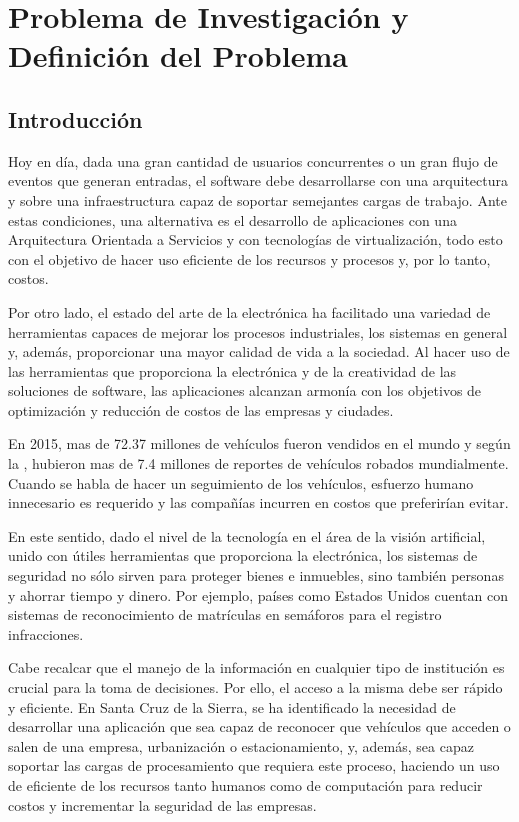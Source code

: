 \chapter{Problema de Investigación y Definición del Problema}
\section{Introducción}

    Hoy en día, dada una gran cantidad de usuarios concurrentes o un gran flujo de eventos que generan entradas, el software debe desarrollarse con una arquitectura y sobre una infraestructura capaz de soportar semejantes cargas de trabajo. Ante estas condiciones, una alternativa es el desarrollo de aplicaciones con una Arquitectura Orientada a Servicios y con tecnologías de virtualización, todo esto con el objetivo de hacer uso eficiente de los recursos y procesos y, por lo tanto, costos.
    
    Por otro lado, el estado del arte de la electrónica ha facilitado una variedad de herramientas capaces de mejorar los procesos industriales, los sistemas en general y, además, proporcionar una mayor calidad de vida a la sociedad. Al hacer uso de las herramientas que proporciona la electrónica y de la creatividad de las soluciones de software, las aplicaciones alcanzan armonía con los objetivos de optimización y reducción de costos de las empresas y ciudades. 
    
    En 2015, mas de 72.37 millones de vehículos fueron vendidos en el mundo \parencite{Statista2016-qw} y según la \cite{Interpol2015-lz}, hubieron mas de 7.4 millones de reportes de vehículos robados mundialmente. Cuando se habla de hacer un seguimiento de los vehículos, esfuerzo humano innecesario es requerido y las compañías incurren en costos que preferirían evitar.
    
    En este sentido, dado el nivel de la tecnología en el área de la visión artificial, unido con útiles herramientas que proporciona la electrónica, los sistemas de seguridad no sólo sirven para proteger bienes e inmuebles, sino también personas y ahorrar tiempo y dinero. Por ejemplo, países como Estados Unidos cuentan con sistemas de reconocimiento de matrículas en semáforos para el registro infracciones. 
    
    Cabe recalcar que el manejo de la información en cualquier tipo de institución es crucial para la toma de decisiones. Por ello, el acceso a la misma debe ser rápido y eficiente. En Santa Cruz de la Sierra, se ha identificado la necesidad de desarrollar una aplicación que sea capaz de reconocer que vehículos que acceden o salen de una empresa, urbanización o estacionamiento, y, además, sea capaz soportar las cargas de procesamiento que requiera este proceso, haciendo un uso de eficiente de los recursos tanto humanos como de computación para reducir costos y incrementar la seguridad de las empresas.
